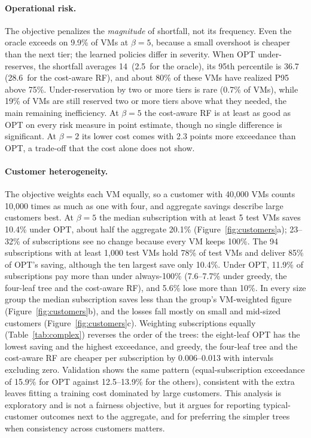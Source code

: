 \documentclass[10pt]{article}
\newcommand{\pp}{\,\text{pp}}
\begin{document}
\paragraph{Operational risk.} The objective penalizes the \emph{magnitude} of shortfall, not its frequency. Even the oracle exceeds on 9.9\% of VMs at $\beta=5$, because a small overshoot is cheaper than the next tier; the learned policies differ in severity. When OPT under-reserves, the shortfall averages 14\pp{} (2.5\pp{} for the oracle), its 95th percentile is 36.7\pp{} (28.6\pp{} for the cost-aware RF), and about 80\% of these VMs have realized P95 above 75\%. Under-reservation by two or more tiers is rare (0.7\% of VMs), while 19\% of VMs are still reserved two or more tiers above what they needed, the main remaining inefficiency. At $\beta=5$ the cost-aware RF is at least as good as OPT on every risk measure in point estimate, though no single difference is significant. At $\beta=2$ its lower cost comes with 2.3 points more exceedance than OPT, a trade-off that the cost alone does not show.

\paragraph{Customer heterogeneity.} The objective weights each VM equally, so a customer with 40,000 VMs counts 10,000 times as much as one with four, and aggregate savings describe large customers best. At $\beta=5$ the median subscription with at least 5 test VMs saves 10.4\% under OPT, about half the aggregate 20.1\% (Figure~\ref{fig:customers}a); 23--32\% of subscriptions see no change because every VM keeps 100\%. The 94 subscriptions with at least 1,000 test VMs hold 78\% of test VMs and deliver 85\% of OPT's saving, although the ten largest save only 10.4\%. Under OPT, 11.9\% of subscriptions pay more than under always-100\% (7.6--7.7\% under greedy, the four-leaf tree and the cost-aware RF), and 5.6\% lose more than 10\%. In every size group the median subscription saves less than the group's VM-weighted figure (Figure~\ref{fig:customers}b), and the losses fall mostly on small and mid-sized customers (Figure~\ref{fig:customers}c). Weighting subscriptions equally (Table~\ref{tab:complex}) reverses the order of the trees: the eight-leaf OPT has the lowest saving and the highest exceedance, and greedy, the four-leaf tree and the cost-aware RF are cheaper per subscription by 0.006--0.013 with intervals excluding zero. Validation shows the same pattern (equal-subscription exceedance of 15.9\% for OPT against 12.5--13.9\% for the others), consistent with the extra leaves fitting a training cost dominated by large customers. This analysis is exploratory and is not a fairness objective, but it argues for reporting typical-customer outcomes next to the aggregate, and for preferring the simpler trees when consistency across customers matters.
\end{document}
